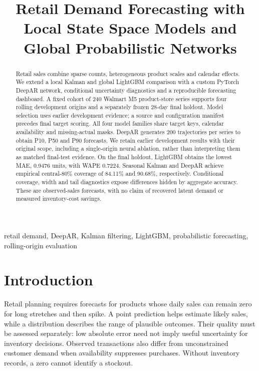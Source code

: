 \documentclass[conference]{IEEEtran}
\begin{document}
\title{Retail Demand Forecasting with Local State Space Models and Global Probabilistic Networks}
\author{
}
\maketitle
\begin{abstract}
Retail sales combine sparse counts, heterogeneous product scales and calendar effects. We extend a local Kalman and global LightGBM comparison with a custom PyTorch DeepAR network, conditional uncertainty diagnostics and a reproducible forecasting dashboard. A fixed cohort of 240 Walmart M5 product-store series supports four rolling development origins and a separately frozen 28-day final holdout. Model selection uses earlier development evidence; a source and configuration manifest precedes final target scoring. All four model families share target keys, calendar availability and missing-actual masks. DeepAR generates 200 trajectories per series to obtain P10, P50 and P90 forecasts. We retain earlier development results with their original scope, including a single-origin neural ablation, rather than interpreting them as matched final-test evidence.
On the final holdout, LightGBM obtains the lowest MAE, 0.9476 units, with WAPE 0.7224. Seasonal Kalman and DeepAR achieve empirical central-80\% coverage of 84.11\% and 90.68\%, respectively. Conditional coverage, width and tail diagnostics expose differences hidden by aggregate accuracy. These are observed-sales forecasts, with no claim of recovered latent demand or measured inventory-cost savings.
\end{abstract}
\begin{IEEEkeywords}retail demand, DeepAR, Kalman filtering, LightGBM, probabilistic forecasting, rolling-origin evaluation\end{IEEEkeywords}

\section{Introduction}
Retail planning requires forecasts for products whose daily sales can remain zero for long stretches and then spike. A point prediction helps estimate likely sales, while a distribution describes the range of plausible outcomes. Their quality must be assessed separately: low absolute error need not imply useful uncertainty for inventory decisions. Observed transactions also differ from unconstrained customer demand when availability suppresses purchases. Without inventory records, a zero cannot identify a stockout.
\end{document}
